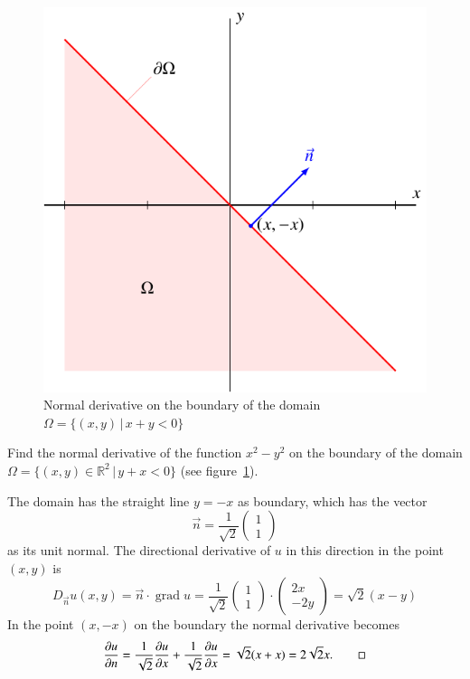 \begin{beispiel}
\begin{figure}
\centering
\includegraphics{2-classification/images/oblique.pdf}
\caption{Normal derivative on the boundary of the domain
$\Omega=\{(x,y)\,|\, x+y<0\}$
\label{conditions:oblique}}
\end{figure}
Find the normal derivative of the function
$x^2-y^2$
on the boundary of the domain
$\Omega=\{(x,y)\in\mathbb R^2\,|\,y+x<0\}$
(see figure~\ref{conditions:oblique}).

The domain has the straight line
$y=-x$ as boundary, which has the vector
\[
\vec n=\frac{1}{\sqrt{2}}\begin{pmatrix}1\\1\end{pmatrix}
\]
as its unit normal.
The directional derivative of $u$ in this direction 
in the point $(x,y)$ is
\[
D_{\vec n}u(x,y)
=
\vec n\cdot\operatorname{grad}u
=
\frac{1}{\sqrt{2}}
\begin{pmatrix}1\\1\end{pmatrix}\cdot\begin{pmatrix}2x\\-2y\end{pmatrix}
=
\sqrt{2}( x-y)
\]
In the point $(x,-x)$ on the boundary the normal derivative becomes
\[
\frac{\partial u}{\partial n}
=
\frac{1}{\sqrt{2}}
\frac{\partial u}{\partial x}
+
\frac{1}{\sqrt{2}}
\frac{\partial u}{\partial x}
=
\sqrt{2}(
x+x)
=
2\sqrt{2}x.
\qedhere
\]
\end{beispiel}

